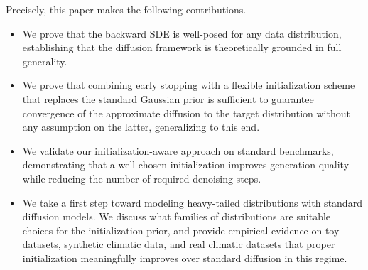 Precisely, this paper makes the following contributions.
\begin{itemize}
    \item We prove that the backward SDE is well-posed for any data distribution, establishing that the diffusion framework is theoretically grounded in full generality.
    \item We prove that combining early stopping with a flexible initialization scheme that replaces the standard Gaussian prior is sufficient to guarantee convergence of the approximate diffusion to the target distribution without any assumption on the latter, generalizing \cite[Theorem 1]{conforti2023kl} to this end.
    \item We validate our initialization-aware approach on standard benchmarks, demonstrating that a well-chosen initialization improves generation quality while reducing the number of required denoising steps.
    \item We take a first step toward modeling heavy-tailed distributions with standard diffusion models. We discuss what families of distributions are suitable choices for the initialization prior, and provide empirical evidence on toy datasets, synthetic climatic data, and real climatic datasets that proper initialization meaningfully improves over standard diffusion in this regime.
\end{itemize}